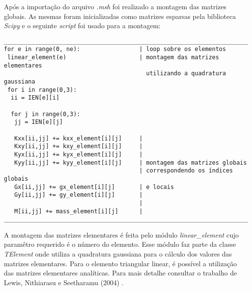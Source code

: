 Após a importação do arquivo \textit{.msh}
foi realizado a montagem das matrizes globais.
As mesmas foram inicializadas como matrizes
esparsas pela biblioteca \textit{Scipy} \cite{scipy}
e o seguinte \textit{script} foi usado para a montagem:




\begin{verbatim}
__________________________________________________________________________
for e in range(0, ne):                 | loop sobre os elementos 
 linear_element(e)                     | montagem das matrizes elementares
                                         utilizando a quadratura gaussiana
 for i in range(0,3):                  
  ii = IEN[e][i]                       
  
  for j in range(0,3):                  
   jj = IEN[e][j]
                                       
   Kxx[ii,jj] += kxx_element[i][j]     |
   Kxy[ii,jj] += kxy_element[i][j]     |
   Kyx[ii,jj] += kyx_element[i][j]     |
   Kyy[ii,jj] += kyy_element[i][j]     | montagem das matrizes globais
                                       | correspondendo os índices globais
   Gx[ii,jj] += gx_element[i][j]       | e locais
   Gy[ii,jj] += gy_element[i][j]       | 
                                       |
   M[ii,jj] += mass_element[i][j]      |
__________________________________________________________________________
\end{verbatim}


\medskip
A montagem das matrizes elementares é feita pelo módulo 
\textit{linear\_element} cujo paramêtro requerido é o 
número do elemento. Esse módulo faz parte da classe \textit{TElement}
onde utiliza a quadratura gaussiana para o cálculo dos
valores das matrizes elementares. Para o elemento triangular
linear, é possível a utilização das matrizes elementares
analíticas. Para mais detalhe consultar o trabalho de Lewis,
Nithiarasu e Seetharamu (2004) \cite{lewis2004}.

